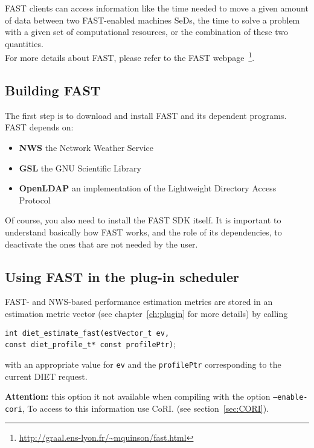 FAST clients can access information like the time needed to move a
given amount of data between two FAST-enabled machines SeDs, the
time to solve a problem with a given set of computational resources,
or the combination of these two quantities.\\

For more details about FAST, please refer to the FAST
webpage~\footnote{\url{http://graal.ens-lyon.fr/~mquinson/fast.html}}.

\subsection{Building FAST}

The first step is to download and install FAST and its
dependent programs.  FAST depends on:
\begin{itemize}
 \item{\textbf{NWS}} the Network Weather Service
 \item{\textbf{GSL}} the GNU Scientific Library
 \item{\textbf{OpenLDAP}} an implementation of the Lightweight
                          Directory Access Protocol
\end{itemize}
Of course, you also need to install the FAST SDK itself. It is important to
understand basically how FAST works, and the role of its dependencies, to
deactivate the ones that are not needed by the user.

\subsection{Using FAST in  the plug-in scheduler}\label{subsection:callFAST}

FAST- and NWS-based performance estimation metrics are stored in
  an estimation metric vector (see chapter~\ref{ch:plugin} for more details) by calling
  \begin{tabbing}
    \texttt{int diet\_estimate\_fast(}\=\texttt{estVector\_t ev,} \\
    \> \texttt{const diet\_profile\_t* const profilePtr)};
  \end{tabbing}
   with an appropriate value for \texttt{ev} and the
   \texttt{profilePtr} corresponding to the current DIET request.

   \textbf{Attention: } this option it not available when compiling 
   with the option \texttt{--enable-cori}, 
   To access to this information use CoRI.
   (see section~\ref{sec:CORI}).

